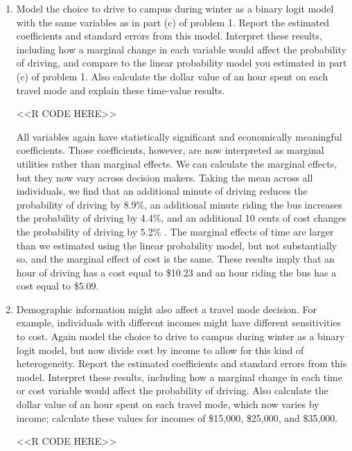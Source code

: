 \documentclass[11pt,letterpaper]{article}
\begin{document}
\begin{enumerate}[label=\alph*., leftmargin=*]
	\item Model the choice to drive to campus during winter as a binary logit model with the same variables as in part (c) of problem 1. Report the estimated coefficients and standard errors from this model. Interpret these results, including how a marginal change in each variable would affect the probability of driving, and compare to the linear probability model you estimated in part (c) of problem 1. Also calculate the dollar value of an hour spent on each travel mode and explain these time-value results.

	<<R CODE HERE>>

	All variables again have statistically significant and economically meaningful coefficients. Those coefficients, however, are now interpreted as marginal utilities rather than marginal effects. We can calculate the marginal effects, but they now vary across decision makers. Taking the mean across all individuals, we find that an additional minute of driving reduces the probability of driving by 8.9\%, an additional minute riding the bus increases the probability of driving by 4.4\%, and an additional 10 cents of cost changes the probability of driving by 5.2\% . The marginal effects of time are larger than we estimated using the linear probability model, but not substantially so, and the marginal effect of cost is the same. These results imply that an hour of driving has a cost equal to \$10.23 and an hour riding the bus has a cost equal to \$5.09.

	\item Demographic information might also affect a travel mode decision. For example, individuals with different incomes might have different sensitivities to cost. Again model the choice to drive to campus during winter as a binary logit model, but now divide cost by income to allow for this kind of heterogeneity. Report the estimated coefficients and standard errors from this model. Interpret these results, including how a marginal change in each time or cost variable would affect the probability of driving. Also calculate the dollar value of an hour spent on each travel mode, which now varies by income; calculate these values for incomes of \$15,000, \$25,000, and \$35,000.

	<<R CODE HERE>>


\end{enumerate}
\end{document}
